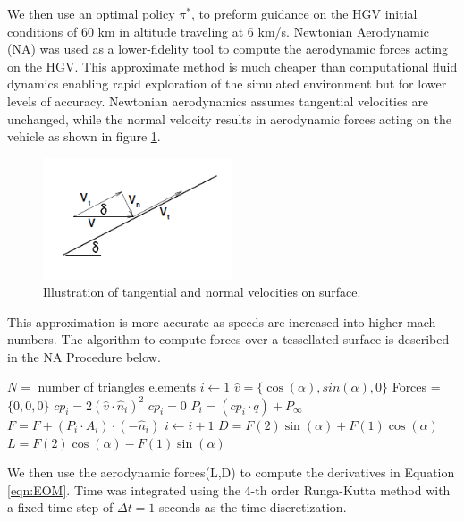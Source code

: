 \documentclass[11pt]{article} %
\begin{document}
We then use an optimal policy $\pi^*$, to preform guidance on the HGV initial conditions of 60 km in altitude traveling
at 6 km/s. Newtonian Aerodynamic (NA) was used as a lower-fidelity tool to compute the aerodynamic forces acting on the
HGV. This approximate method is much cheaper than computational fluid dynamics enabling rapid exploration of the simulated
environment but for lower levels of accuracy. Newtonian aerodynamics assumes tangential velocities are unchanged, while the
normal velocity results in aerodynamic forces acting on the vehicle as shown in figure \ref{fig:NA}. 
\begin{figure}[H]
   \centering
     \includegraphics[width=0.5\textwidth]{images/NA.png}
   \caption{Illustration of tangential and normal velocities on surface.}
   \label{fig:NA}
\end{figure}
This approximation is more accurate as speeds are increased into higher mach numbers. The algorithm to compute forces over
a tessellated surface is described in the NA Procedure below.

\begin{algorithmic}
   \State $N =$ number of triangles elements
       \State $i \gets 1$
   \State $\hat{v} =\{\cos(\alpha),sin(\alpha),0\} $
   \State Forces =$\{0,0,0\} $
       \State  ${cp}_i = 2 \left(\hat{v} \cdot \hat{n}_i\right)^2$
   \Else
       \State  ${cp}_i = 0$ 
   \EndIf
   \State  $P_i=({cp}_i \cdot q)+P_{\infty}$
   \State  $F = F + (P_i \cdot A_i)\cdot(-\hat{n}_i) $
   \State $i \gets i+1$
   \EndWhile
   \State  $D=F(2)\sin(\alpha)+F(1)\cos(\alpha)$
   \State  $L=F(2)\cos(\alpha)-F(1)\sin(\alpha)$
   \EndProcedure
\end{algorithmic}

We then use the aerodynamic forces(L,D) to compute the derivatives in Equation \ref{eqn:EOM}. Time was integrated using the
4-th order Runga-Kutta method with a fixed time-step of $\Delta t = 1$ seconds as the time discretization. 
\end{document}
